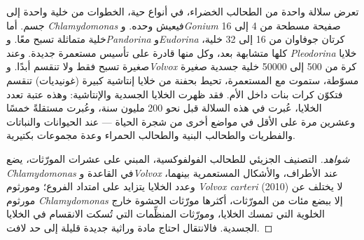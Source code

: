 \begin{proposition}\label{prop:b2:unicellular-diversity:volvox}
تعرض سلالة واحدة من الطحالب الخضراء، في أنواع حية، الخطوات من خلية
واحدة إلى جسم. أما \emph{Chlamydomonas} فيعيش وحده. و\emph{Gonium}
صفيحة مسطحة من 4 إلى 16 خلية متماثلة تسبح معًا. و\emph{Pandorina}
و\emph{Eudorina} كرتان جوفاوان من 16 إلى 32 خلية، كلها متشابهة
بعد، وكل منها قادرة على تأسيس مستعمرة جديدة. وعند \emph{Pleodorina}
خلايا صغيرة تسبح فقط ولا تنقسم أبدًا. و\emph{Volvox} كرة من
\num{500} إلى \num{50000} خلية جسدية صغيرة مسوّطة، ستموت مع
المستعمرة، تحيط بحفنة من خلايا إنتاشية كبيرة (غونيديات) تنقسم
فتكوّن كرات بنات داخل الأم. فقد ظهرت الخلايا الجسدية والإنتاشية:
وهذه عتبة تعدد الخلايا، عُبرت في هذه السلالة قبل نحو \num{200}
مليون سنة، وعُبرت مستقلةً خمسًا وعشرين مرة على الأقل في مواضع أخرى
من شجرة الحياة --- عند الحيوانات والنباتات والفطريات والطحالب
البنية والطحالب الحمراء وعدة مجموعات بكتيرية.
\end{proposition}
\begin{proof}[شواهد]
التصنيف الجزيئي للطحالب الفولفوكسية، المبني على عشرات المورّثات،
يضع \emph{Chlamydomonas} في القاعدة و\emph{Volvox} عند الأطراف،
والأشكال المستعمرية بينهما، وعدد الخلايا يتزايد على امتداد الفروع؛
ومورثوم \emph{Volvox carteri} (2010) لا يختلف عن مورثوم
\emph{Chlamydomonas} إلا ببضع مئات من المورّثات، أكثرها مورّثات
الحشوة خارج الخلوية التي تمسك الخلايا، ومورّثات المنظِّمات التي
تُسكت الانقسام في الخلايا الجسدية. فالانتقال احتاج مادة وراثية
جديدة قليلة إلى حد لافت.
\end{proof}

